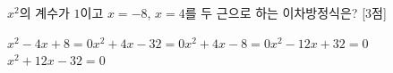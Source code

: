 $x^2$의 계수가 $1$이고 $x=-8$, $x=4$를 두 근으로 하는 이차방정식은? \mbox{[3점]}
\begin{choicesii}{$x^2-4x+8=0$}{$x^2+4x-32=0$}{$x^2+4x-8=0$}{$x^2-12x+32=0$}{$x^2+12x-32=0$}\end{choicesii}
